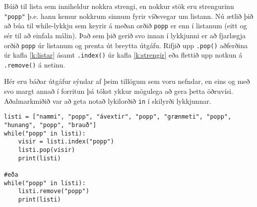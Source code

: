 \begin{exercise}\label{lyk8}
Búið til lista sem inniheldur nokkra strengi, en nokkur stök eru strengurinn \texttt{"popp"} þ.e. hann kemur nokkrum sinnum fyrir víðsvegar um listann.
Nú ætlið þið að búa til while-lykkju sem keyrir á meðan orðið \texttt{popp} er enn í listanum (eitt og sér til að einfala málin).
Það sem þið gerið svo innan í lykkjunni er að fjarlægja orðið \texttt{popp} úr listanum og prenta út breytta útgáfu.
Rifjið upp \texttt{.pop()} aðferðina úr kafla \ref{k:listar} ásamt \texttt{.index()} úr kafla \ref{k:strengir} eða flettið upp notkun á \texttt{.remove()} á netinu.
\end{exercise}
\begin{Answer}[ref={lyk8}]
Hér eru báðar útgáfur sýndar af þeim tillögum sem voru nefndar, en eins og með svo margt annað í forritun þá tókst ykkur mögulega að gera þetta öðruvísi.
Aðalmarkmiðið var að geta notað lykilorðið \texttt{in} í skilyrði lykkjunnar.
	\begin{lstlisting}
listi = ["nammi", "popp", "ávextir", "popp", "grænmeti", "popp", "hunang", "popp", "brauð"]
while("popp" in listi):
	visir = listi.index("popp")
	listi.pop(visir)
	print(listi)
		
#eða
while("popp" in listi):
	listi.remove("popp")
	print(listi)\end{lstlisting}
\end{Answer}